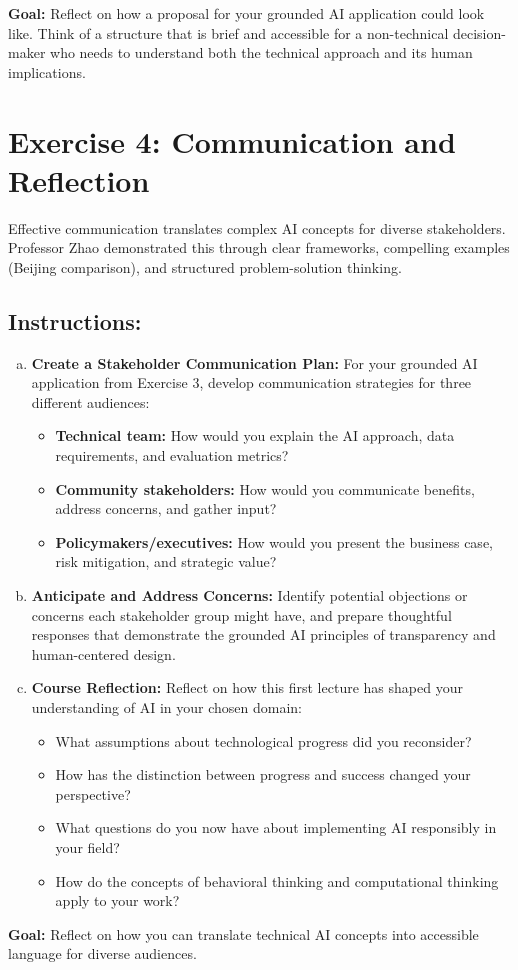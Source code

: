 \documentclass[11pt]{article}
\begin{document}
\noindent\textbf{Goal:} Reflect on how a proposal for your grounded AI application could look like. Think of a structure that is brief and accessible for a non-technical decision-maker who needs to understand both the technical approach and its human implications.

\section*{Exercise 4: Communication and Reflection}

Effective communication translates complex AI concepts for diverse stakeholders. Professor Zhao demonstrated this through clear frameworks, compelling examples (Beijing comparison), and structured problem-solution thinking.

\subsection*{Instructions:}
\begin{enumerate}[(a)]
\item \textbf{Create a Stakeholder Communication Plan:} For your grounded AI application from Exercise 3, develop communication strategies for three different audiences:
\begin{itemize}
\item \textbf{Technical team:} How would you explain the AI approach, data requirements, and evaluation metrics?
\item \textbf{Community stakeholders:} How would you communicate benefits, address concerns, and gather input?
\item \textbf{Policymakers/executives:} How would you present the business case, risk mitigation, and strategic value?
\end{itemize}

\item \textbf{Anticipate and Address Concerns:} Identify potential objections or concerns each stakeholder group might have, and prepare thoughtful responses that demonstrate the grounded AI principles of transparency and human-centered design.

\item \textbf{Course Reflection:} Reflect on how this first lecture has shaped your understanding of AI in your chosen domain:
\begin{itemize}
\item What assumptions about technological progress did you reconsider?
\item How has the distinction between progress and success changed your perspective?
\item What questions do you now have about implementing AI responsibly in your field?
\item How do the concepts of behavioral thinking and computational thinking apply to your work?
\end{itemize}
\end{enumerate}

\noindent\textbf{Goal:} Reflect on how you can translate technical AI concepts into accessible language for diverse audiences.
\end{document}
